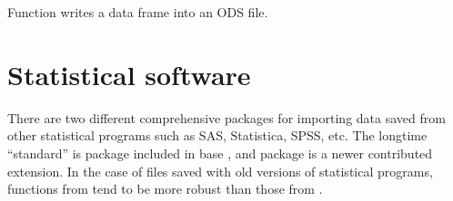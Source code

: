 \documentclass[krantz2]{krantz}\usepackage{knitr}
\begin{document}
\begin{knitrout}\footnotesize
{}\color{fgcolor}\begin{kframe}
\begin{alltt}
 \hlkwb{<-} \hlstd{(}\hlstd{,}  \hlstd{=} \hlstd{)}
\end{alltt}


{\ttfamily\noindent\bfseries{}}\end{kframe}
\end{knitrout}

\begin{knitrout}\footnotesize
{}\color{fgcolor}\begin{kframe}
\begin{alltt}
\end{alltt}


{\ttfamily\noindent\bfseries\color{errorcolor}{\#\# Error in eval(expr, envir, enclos): object 'ods.df' not found}}\end{kframe}
\end{knitrout}

Function  writes a data frame into an ODS file.

\section{Statistical software}\label{sec:files:stat}

There are two different comprehensive packages for importing data saved from other statistical programs such as SAS, Statistica, SPSS, etc. The longtime ``standard'' is package  included in base \Rlang, and package  is a newer contributed extension. In the case of files saved with old versions of statistical programs, functions from  tend to be more robust than those from .

\subsection[foreign]{}
\end{document}
